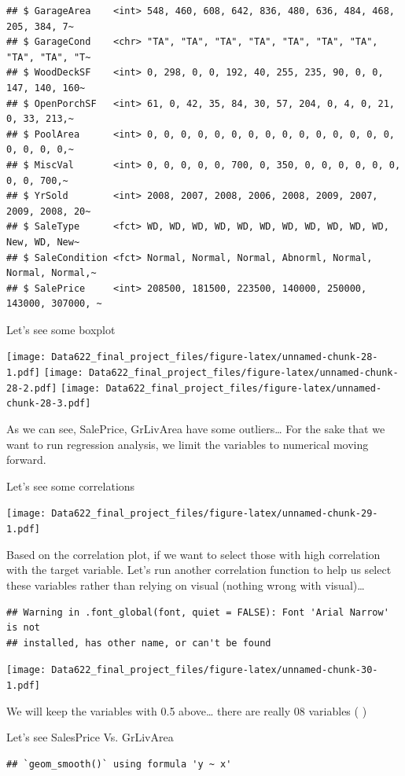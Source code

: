\documentclass[
]{article}
\begin{document}
\begin{verbatim}
## $ GarageArea    <int> 548, 460, 608, 642, 836, 480, 636, 484, 468, 205, 384, 7~
## $ GarageCond    <chr> "TA", "TA", "TA", "TA", "TA", "TA", "TA", "TA", "TA", "T~
## $ WoodDeckSF    <int> 0, 298, 0, 0, 192, 40, 255, 235, 90, 0, 0, 147, 140, 160~
## $ OpenPorchSF   <int> 61, 0, 42, 35, 84, 30, 57, 204, 0, 4, 0, 21, 0, 33, 213,~
## $ PoolArea      <int> 0, 0, 0, 0, 0, 0, 0, 0, 0, 0, 0, 0, 0, 0, 0, 0, 0, 0, 0,~
## $ MiscVal       <int> 0, 0, 0, 0, 0, 700, 0, 350, 0, 0, 0, 0, 0, 0, 0, 0, 700,~
## $ YrSold        <int> 2008, 2007, 2008, 2006, 2008, 2009, 2007, 2009, 2008, 20~
## $ SaleType      <fct> WD, WD, WD, WD, WD, WD, WD, WD, WD, WD, WD, New, WD, New~
## $ SaleCondition <fct> Normal, Normal, Normal, Abnorml, Normal, Normal, Normal,~
## $ SalePrice     <int> 208500, 181500, 223500, 140000, 250000, 143000, 307000, ~
\end{verbatim}

Let's see some boxplot

\texttt{[image: Data622\_final\_project\_files/figure-latex/unnamed-chunk-28-1.pdf]}
\texttt{[image: Data622\_final\_project\_files/figure-latex/unnamed-chunk-28-2.pdf]}
\texttt{[image: Data622\_final\_project\_files/figure-latex/unnamed-chunk-28-3.pdf]}

As we can see, SalePrice, GrLivArea have some outliers\ldots{} For the
sake that we want to run regression analysis, we limit the variables to
numerical moving forward.

Let's see some correlations

\texttt{[image: Data622\_final\_project\_files/figure-latex/unnamed-chunk-29-1.pdf]}

Based on the correlation plot, if we want to select those with high
correlation with the target variable. Let's run another correlation
function to help us select these variables rather than relying on visual
(nothing wrong with visual)\ldots{}

\begin{verbatim}
## Warning in .font_global(font, quiet = FALSE): Font 'Arial Narrow' is not
## installed, has other name, or can't be found
\end{verbatim}

\texttt{[image: Data622\_final\_project\_files/figure-latex/unnamed-chunk-30-1.pdf]}

We will keep the variables with 0.5 above\ldots{} there are really 08
variables ( )

Let's see SalesPrice Vs. GrLivArea

\begin{verbatim}
## `geom_smooth()` using formula 'y ~ x'
\end{verbatim}
\end{document}
